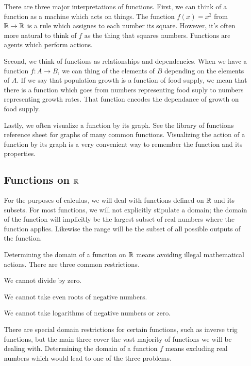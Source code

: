 \documentclass[fleqn]{report}
\begin{document}
There are three major interpretations of functions.
First, we can think of a function as a machine which acts on
things. The function $f(x) = x^2$ from $\mathbb{R} \rightarrow
\mathbb{R}$ is a rule which assignes to each number its square.
However, it's often more natural to think of $f$ as the thing that
squares numbers. Functions are agents which
perform actions. 

Second, we think of functions as relationships and
dependencies. When we have a function $f: A \rightarrow B$,
we can thing of the elements of $B$ depending on the elements
of $A$. If we say that population growth is a function of
food supply, we mean that there is a function which goes from
numbers representing food suply to numbers representing growth
rates. That function encodes the dependance of growth on food
supply.

Lastly, we often visualize a function by its graph. See the
library of functions reference sheet for graphs of many common
functions. Visualizing the action of a function by its graph is
a very convenient way to remember the function and its
properties.

\subsection{Functions on $\mathbb{R}$}
\label{real-functions}

For the purposes of calculus, we will deal with functions
defined on $\mathbb{R}$ and its subsets. For most functions, we will
not explicitly stipulate a domain; the domain of the function
will implicitly be the largest subset of real numbers where
the function applies. Likewise the range will be the subset
of all possible outputs of the function.

Determining the domain of a function on $\mathbb{R}$ means avoiding
illegal mathematical actions. There are three common restrictions.
\begin{smallitemize}
\item We cannot divide by zero.
\item We cannot take even roots of negative numbers.
\item We cannot take logarithms of negative numbers or zero.
\end{smallitemize}
There are special domain restrictions for certain
functions, such as inverse trig functions, but the main three
cover the vast majority of functions we will be dealing with.
Determining the domain of a function $f$ means excluding real
numbers which would lead to one of the three problems.
\end{document}

